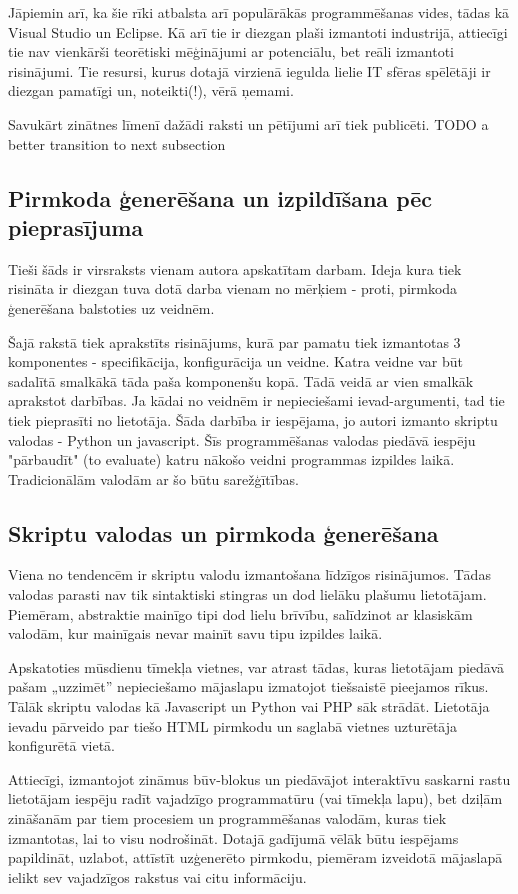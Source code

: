 Jāpiemin arī, ka šie rīki atbalsta arī populārākās programmēšanas vides, tādas kā Visual Studio un Eclipse. Kā arī tie ir diezgan plaši izmantoti industrijā, attiecīgi tie nav vienkārši teorētiski mēģinājumi ar potenciālu, bet reāli izmantoti risinājumi. Tie resursi, kurus dotajā virzienā iegulda lielie IT sfēras spēlētāji ir diezgan pamatīgi un, noteikti(!), vērā ņemami.

Savukārt zinātnes līmenī dažādi raksti un pētījumi arī tiek publicēti. TODO a better transition to next subsection
\subsection{Pirmkoda ģenerēšana un izpildīšana pēc pieprasījuma}
Tieši šāds ir virsraksts vienam autora apskatītam darbam. Ideja kura tiek risināta ir diezgan tuva dotā darba vienam no mērķiem - proti, pirmkoda ģenerēšana balstoties uz veidnēm.

Šajā rakstā tiek aprakstīts risinājums, kurā par pamatu tiek izmantotas 3 komponentes - specifikācija, konfigurācija un veidne. Katra veidne var būt sadalītā smalkākā tāda paša komponenšu kopā. Tādā veidā ar vien smalkāk aprakstot darbības. Ja kādai no veidnēm ir nepieciešami ievad-argumenti, tad tie tiek pieprasīti no lietotāja. Šāda darbība ir iespējama, jo autori izmanto skriptu valodas - Python un javascript. Šīs programmēšanas valodas piedāvā iespēju "pārbaudīt" (to evaluate) katru nākošo veidni programmas izpildes laikā. Tradicionālām valodām ar šo būtu sarežģītības.

\subsection{Skriptu valodas un pirmkoda ģenerēšana}
Viena no tendencēm ir skriptu valodu izmantošana līdzīgos risinājumos. Tādas valodas parasti nav tik sintaktiski stingras un dod lielāku plašumu lietotājam. Piemēram, abstraktie mainīgo tipi dod lielu brīvību, salīdzinot ar klasiskām valodām, kur mainīgais nevar mainīt savu tipu izpildes laikā. 

Apskatoties mūsdienu tīmekļa vietnes, var atrast tādas, kuras lietotājam piedāvā pašam „uzzimēt” nepieciešamo mājaslapu izmatojot tiešsaistē pieejamos rīkus. Tālāk skriptu valodas kā Javascript un Python vai PHP sāk strādāt. Lietotāja ievadu pārveido par tiešo HTML pirmkodu un saglabā vietnes uzturētāja konfigurētā vietā.

Attiecīgi, izmantojot zināmus būv-blokus un piedāvājot interaktīvu saskarni rastu lietotājam iespēju radīt vajadzīgo programmatūru (vai tīmekļa lapu), bet dziļām zināšanām par tiem procesiem un programmēšanas valodām, kuras tiek izmantotas, lai to visu nodrošināt. Dotajā gadījumā vēlāk būtu iespējams papildināt, uzlabot, attīstīt uzģenerēto pirmkodu, piemēram izveidotā mājaslapā ielikt sev vajadzīgos rakstus vai citu informāciju. 

